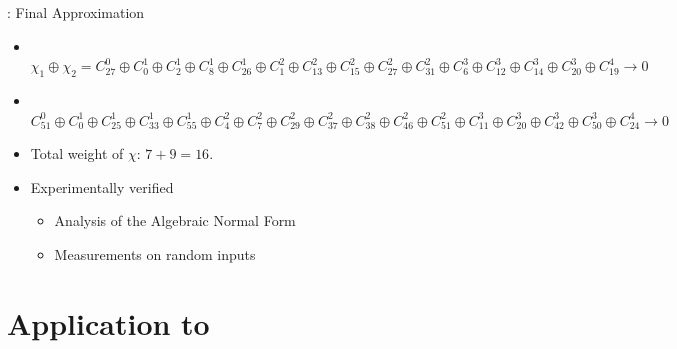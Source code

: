 \documentclass[aspectratio=169,10pt,webfont]{beamer}
\begin{document}
\begin{frame}{\MiniMORUS: Final Approximation}

\begin{itemize}
  \item \MiniMORUS[640]\\
  $\chi_1 \oplus \chi_2 = C^0_{27} \oplus C^1_{0} \oplus C^1_{2} \oplus C^1_{8} \oplus C^1_{26} \oplus C^2_{1} \oplus C^2_{13} \oplus C^2_{15} \oplus
   C^2_{27} \oplus C^2_{31} \oplus C^3_{6} \oplus C^3_{12} \oplus C^3_{14} \oplus C^3_{20} \oplus C^4_{19} \to 0$
   \item \MiniMORUS[1280]\\
  $C^0_{51} \oplus C^1_{0} \oplus C^1_{25} \oplus C^1_{33} \oplus C^1_{55} \oplus C^2_{4} \oplus C^2_{7} \oplus C^2_{29} \oplus C^2_{37} \oplus
  C^2_{38} \oplus C^2_{46} \oplus C^2_{51} \oplus C^3_{11} \oplus C^3_{20} \oplus C^3_{42} \oplus C^3_{50} \oplus C^4_{24} \to 0$
  \bigskip
  \item Total weight of $\chi$: $7 + 9 = 16$.
  \bigskip
  \item Experimentally verified
    \begin{itemize}
      \item Analysis of the Algebraic Normal Form
      \item Measurements on random inputs 
    \end{itemize}
\end{itemize}


\end{frame}

\section{\emph{\itemwrap{\faCube}} Application to \MORUS}

\end{document}
